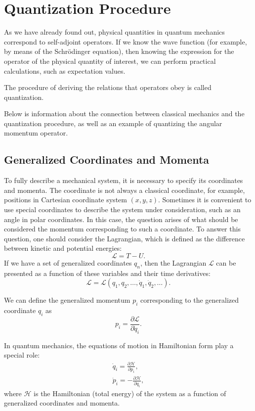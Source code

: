 \section{Quantization Procedure}
As we have already found out, physical quantities in quantum mechanics
correspond to self-adjoint operators. If we know the wave function
(for example, by means of the Schrödinger equation), then knowing the expression
for the operator of the physical quantity of interest, we can perform
practical calculations, such as expectation values.

The procedure of deriving the relations that operators obey is called
quantization.

Below is information about the connection between classical mechanics and the quantization procedure,
as well as an example of quantizing the angular momentum operator.

\subsection{Generalized Coordinates and Momenta}

To fully describe a mechanical system, it is necessary to specify its
coordinates and momenta. The coordinate is not always a classical coordinate, for example, positions in Cartesian coordinate system $(x,y,z)$.
Sometimes it is convenient to use special coordinates to describe the system under consideration,
such as an angle in polar coordinates. In this case, the question arises of what should be considered
the momentum corresponding to such a coordinate. To answer this question,
one should consider the Lagrangian, which is defined as the difference
between kinetic and potential energies:
\[
\mathcal{L} = T - U.
\]
If we have a set of generalized coordinates ${q_n}$, then the Lagrangian
$\mathcal{L}$ can be presented as a function of these variables and their
time derivatives:
\[
\mathcal{L} = \mathcal{L}\left(q_1, q_2, \dots, \dot{q}_1, \dot{q}_2,
\dots \right).
\]

We can define the generalized momentum $p_i$ corresponding to the generalized
coordinate $q_i$ as
\[
p_i = \frac{\partial \mathcal{L}}{\partial \dot{q}_i}.
\]

In quantum mechanics, the equations of motion in Hamiltonian form play a special role:
\begin{eqnarray}
\dot{q}_i = \frac{\partial \mathcal{H}}{\partial p_i},
\nonumber \\
\dot{p}_i = - \frac{\partial \mathcal{H}}{\partial q_i},
\label{eq:add:quantel:hamilton}
\end{eqnarray}
where $\mathcal{H}$ is the Hamiltonian (total energy) of the system as a function
of generalized coordinates and momenta.


